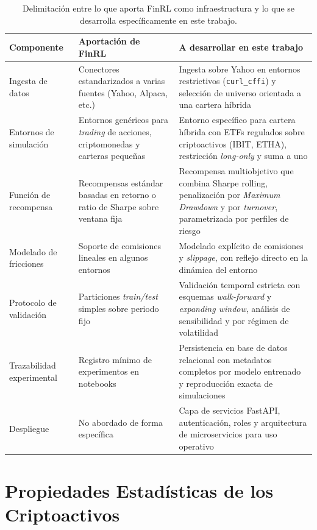\documentclass[IB,a4paper]{TFUOC}
\begin{document}
\begin{table}[h]
\centering
\renewcommand{\arraystretch}{1.25}
\begin{tabular}{|p{4.0cm}|p{5.0cm}|p{5.0cm}|}
\hline
\textbf{Componente} & \textbf{Aportación de FinRL} & \textbf{A desarrollar en este trabajo} \\ \hline
Ingesta de datos & Conectores estandarizados a varias fuentes (Yahoo, Alpaca, etc.) & Ingesta sobre Yahoo en entornos restrictivos (\texttt{curl\_cffi}) y selección de universo orientada a una cartera híbrida \\ \hline
Entornos de simulación & Entornos genéricos para \textit{trading} de acciones, criptomonedas y carteras pequeñas & Entorno específico para cartera híbrida con ETFs regulados sobre criptoactivos (IBIT, ETHA), restricción \textit{long-only} y suma a uno \\ \hline
Función de recompensa & Recompensas estándar basadas en retorno o ratio de Sharpe sobre ventana fija & Recompensa multiobjetivo que combina Sharpe rolling, penalización por \textit{Maximum Drawdown} y por \textit{turnover}, parametrizada por perfiles de riesgo \\ \hline
Modelado de fricciones & Soporte de comisiones lineales en algunos entornos & Modelado explícito de comisiones y \textit{slippage}, con reflejo directo en la dinámica del entorno \\ \hline
Protocolo de validación & Particiones \textit{train/test} simples sobre periodo fijo & Validación temporal estricta con esquemas \textit{walk-forward} y \textit{expanding window}, análisis de sensibilidad y por régimen de volatilidad \\ \hline
Trazabilidad experimental & Registro mínimo de experimentos en notebooks & Persistencia en base de datos relacional con metadatos completos por modelo entrenado y reproducción exacta de simulaciones \\ \hline
Despliegue & No abordado de forma específica & Capa de servicios FastAPI, autenticación, roles y arquitectura de microservicios para uso operativo \\ \hline
\end{tabular}
\caption{Delimitación entre lo que aporta FinRL como infraestructura y lo que se desarrolla específicamente en este trabajo.}
\label{tab:finrl_vs_tfm}
\end{table}

\chapter{Propiedades Estadísticas de los Criptoactivos}
\label{anx:cripto_stats}
\end{document}
